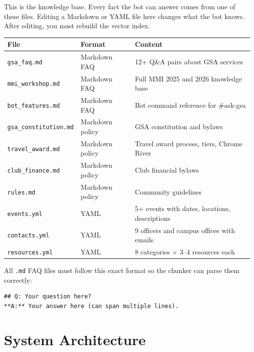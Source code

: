\documentclass[12pt,letterpaper]{article}
\begin{document}
This is the knowledge base. Every fact the bot can answer comes from one of
these files. Editing a Markdown or YAML file here changes what the bot knows.
After editing, you must rebuild the vector index.

\begin{center}
\begin{longtable}{lll}
\toprule
\textbf{File} & \textbf{Format} & \textbf{Content} \\
\midrule
\texttt{gsa\_faq.md} & Markdown FAQ & 12+ Q\&A pairs about GSA services \\
\texttt{mmi\_workshop.md} & Markdown FAQ & Full MMI 2025 and 2026 knowledge base \\
\texttt{bot\_features.md} & Markdown FAQ & Bot command reference for \#ask-gsa \\
\texttt{gsa\_constitution.md} & Markdown policy & GSA constitution and bylaws \\
\texttt{travel\_award.md} & Markdown policy & Travel award process, tiers, Chrome River \\
\texttt{club\_finance.md} & Markdown policy & Club financial bylaws \\
\texttt{rules.md} & Markdown policy & Community guidelines \\
\texttt{events.yml} & YAML & 5+ events with dates, locations, descriptions \\
\texttt{contacts.yml} & YAML & 9 officers and campus offices with emails \\
\texttt{resources.yml} & YAML & 8 categories $\times$ 3–4 resources each \\
\bottomrule
\end{longtable}
\end{center}

\begin{infobox}
All \texttt{.md} FAQ files must follow this exact format so the chunker can
parse them correctly:
\begin{lstlisting}
## Q: Your question here?
**A:** Your answer here (can span multiple lines).
\end{lstlisting}
\end{infobox}

\section{System Architecture}
\end{document}
